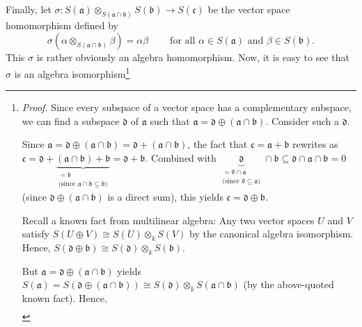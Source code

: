 \documentclass
[numbers=enddot,12pt,final,onecolumn,german,notitlepage]{scrartcl}%
\theoremstyle{definition}
\begin{document}
Finally, let $\sigma:S\left(  \mathfrak{a}\right)  \otimes_{S\left(
\mathfrak{a}\cap\mathfrak{b}\right)  }S\left(  \mathfrak{b}\right)
\rightarrow S\left(  \mathfrak{c}\right)  $ be the vector space homomorphism
defined by%
\[
\sigma\left(  \alpha\otimes_{S\left(  \mathfrak{a}\cap\mathfrak{b}\right)
}\beta\right)  =\alpha\beta\ \ \ \ \ \ \ \ \ \ \text{for all }\alpha\in
S\left(  \mathfrak{a}\right)  \text{ and }\beta\in S\left(  \mathfrak{b}%
\right)  .
\]
This $\sigma$ is rather obviously an algebra homomorphism. Now, it is easy to
see that $\sigma$ is an algebra isomorphism\footnote{\textit{Proof.} Since
every subspace of a vector space has a complementary subspace, we can find a
subspace $\mathfrak{d}$ of $\mathfrak{a}$ such that $\mathfrak{a}%
=\mathfrak{d}\oplus\left(  \mathfrak{a}\cap\mathfrak{b}\right)  $. Consider
such a $\mathfrak{d}$.
\par
Since $\mathfrak{a}=\mathfrak{d}\oplus\left(  \mathfrak{a}\cap\mathfrak{b}%
\right)  =\mathfrak{d}+\left(  \mathfrak{a}\cap\mathfrak{b}\right)  $, the
fact that $\mathfrak{c}=\mathfrak{a}+\mathfrak{b}$ rewrites as $\mathfrak{c}%
=\mathfrak{d}+\underbrace{\left(  \mathfrak{a}\cap\mathfrak{b}\right)
+\mathfrak{b}}_{\substack{=\mathfrak{b}\\\text{(since }\mathfrak{a}%
\cap\mathfrak{b}\subseteq\mathfrak{b}\text{)}}}=\mathfrak{d}+\mathfrak{b}$.
Combined with $\underbrace{\mathfrak{d}}_{\substack{=\mathfrak{d}%
\cap\mathfrak{a}\\\text{(since }\mathfrak{d}\subseteq\mathfrak{a}\text{)}%
}}\cap\mathfrak{b}\subseteq\mathfrak{d}\cap\mathfrak{a}\cap\mathfrak{b}=0$
(since $\mathfrak{d}\oplus\left(  \mathfrak{a}\cap\mathfrak{b}\right)  $ is a
direct sum), this yields $\mathfrak{c}=\mathfrak{d}\oplus\mathfrak{b}$.
\par
Recall a known fact from multilinear algebra: Any two vector spaces $U$ and
$V$ satisfy $S\left(  U\oplus V\right)  \cong S\left(  U\right)  \otimes
_{k}S\left(  V\right)  $ by the canonical algebra isomorphism. Hence,
$S\left(  \mathfrak{d}\oplus\mathfrak{b}\right)  \cong S\left(  \mathfrak{d}%
\right)  \otimes_{k}S\left(  \mathfrak{b}\right)  $.
\par
But $\mathfrak{a}= \mathfrak{d} \oplus\left(  \mathfrak{a}\cap\mathfrak{b}%
\right)  $ yields $S\left(  \mathfrak{a}\right)  =S\left(  \mathfrak{d}%
\oplus\left(  \mathfrak{a}\cap\mathfrak{b}\right)  \right)  \cong S\left(
\mathfrak{d}\right)  \otimes_{k}S\left(  \mathfrak{a}\cap\mathfrak{b}\right)
$ (by the above-quoted known fact). Hence,%
\begin{align*}

\end{align*}}
\end{document}
